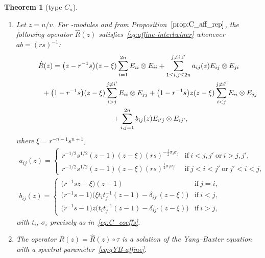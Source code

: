 \documentclass[10pt,a4paper]{amsart}
\numberwithin{equation}{section}
\newtheorem{Theorem}{Theorem}[section]
\newcommand{\ssp}{\mathfrak{sp}}
\begin{document}
\begin{Theorem}[type $C_{n}$]\label{thm:C_AffRMatrix}\quad
\begin{enumerate}
\item[$(a)$] Let $z=u/v$. For \smash{$U_{r,s}\big(\widehat{\ssp}_{2n}\big)$}-modules  and  from Proposition~$\ref{prop:C_aff_rep}$, the following operator $\hat{R}(z)$ satisfies~\eqref{eq:affine-intertwiner} whenever $ab = (rs)^{-1}$:
\begin{gather}
 \hat{R}(z) = \bigl(z - r^{-1}s\bigr)(z - \xi)\sum_{i = 1}^{2n}E_{ii} \otimes E_{ii} + \sum_{1 \le i,j \le 2n}^{j \neq i,i'}a_{ij}(z)E_{ij} \otimes E_{ji}\nonumber \\
 \hphantom{\hat{R}(z) =}{} + \bigl(1 - r^{-1}s\bigr)(z - \xi)\sum_{i > j}^{j \neq i'}E_{ii} \otimes E_{jj} +\bigl(1 - r^{-1}s\bigr)z(z - \xi)\sum_{i < j}^{j \neq i'}E_{ii} \otimes E_{jj} \nonumber\\
 \hphantom{\hat{R}(z) =}{} + \sum_{i,j = 1}^{2n} b_{ij}(z)E_{i'j} \otimes E_{ij'},\label{eq:C_AffRMatrix}
\end{gather}
where $\xi = r^{-n - 1}s^{n + 1}$,
\begin{gather*}
 a_{ij}(z) =
 \begin{cases}
 r^{-1/2}s^{1/2}(z - 1)(z - \xi)(rs)^{-\frac{1}{2}\sigma_{i}\sigma_{j}} &
 \text{if}\ i < j,j'\ \text{or}\ i > j,j', \\
 r^{-1/2}s^{1/2}(z - 1)(z - \xi)(rs)^{\frac{1}{2}\sigma_{i}\sigma_{j}} &
 \text{if}\ j < i < j'\ \text{or}\ j' < i < j,
 \end{cases}
\\
 b_{ij}(z) =
 \begin{cases}
 \bigl(r^{-1}sz - \xi\bigr)(z - 1) & \text{if}\ j = i, \\
 \bigl(r^{-1}s - 1\bigr)\bigl(\xi t_{i}t_{j}^{-1}(z - 1) - \delta_{ij'}(z - \xi)\bigr) & \text{if}\ i < j ,\\
 \bigl(r^{-1}s - 1\bigr)z\bigl(t_{i}t_{j}^{-1}(z - 1) - \delta_{ij'}(z - \xi)\bigr) & \text{if}\ i > j,
 \end{cases}
\end{gather*}
with $t_{i}$, $\sigma_{i}$ precisely as in~\eqref{eq:C_coeffs}.

\item[$(b)$] The operator $R(z)=\hat{R}(z)\circ \tau$ is a solution of the Yang--Baxter equation with a spectral parameter~\eqref{eq:qYB-affine}.
\end{enumerate}
\end{Theorem}
\end{document}
